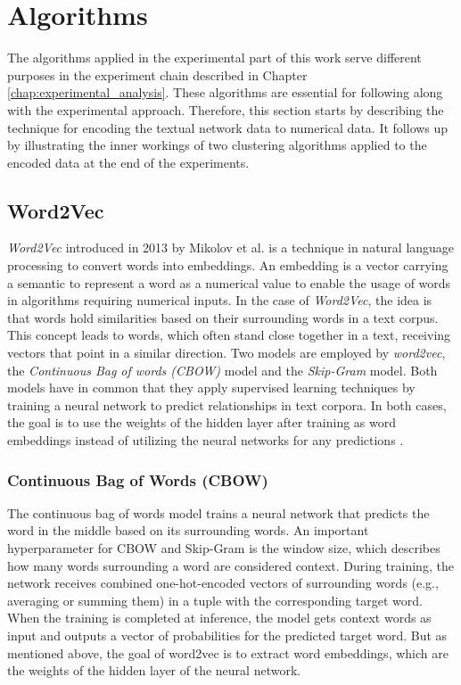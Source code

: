 \documentclass[
    fontsize=12pt,
    headings=small,
    parskip=half,           %
    bibliography=totoc,
    numbers=noenddot,       %
    open=any,               %
    ]{scrreprt}
\begin{document}
\section{Algorithms}
The algorithms applied in the experimental part of this work serve different purposes in the experiment chain described in Chapter \ref{chap:experimental_analysis}. These algorithms are essential for following along with the experimental approach. Therefore, this section starts by describing the technique for encoding the textual network data to numerical data. It follows up by illustrating the inner workings of two clustering algorithms applied to the encoded data at the end of the experiments.


\subsection{Word2Vec}
\emph{Word2Vec} introduced in 2013 by Mikolov et al. is a technique in natural language processing to convert words into embeddings. An embedding is a vector carrying a semantic to represent a word as a numerical value to enable the usage of words in algorithms requiring numerical inputs. In the case of \emph{Word2Vec}, the idea is that words hold similarities based on their surrounding words in a text corpus. This concept leads to words, which often stand close together in a text, receiving vectors that point in a similar direction. Two models are employed by \emph{word2vec}, the \emph{Continuous Bag of words (CBOW)} model and the \emph{Skip-Gram} model. Both models have in common that they apply supervised learning techniques by training a neural network to predict relationships in text corpora. In both cases, the goal is to use the weights of the hidden layer after training as word embeddings instead of utilizing the neural networks for any predictions \cite{mikolov2013efficient} \cite{rong2014word2vec}.

\subsubsection{Continuous Bag of Words (CBOW)}
The continuous bag of words model trains a neural network that predicts the word in the middle based on its surrounding words. An important hyperparameter for CBOW and Skip-Gram is the window size, which describes how many words surrounding a word are considered context. 
During training, the network receives combined one-hot-encoded vectors of surrounding words (e.g., averaging or summing them) in a tuple with the corresponding target word. When the training is completed at inference, the model gets context words as input and outputs a vector of probabilities for the predicted target word. But as mentioned above, the goal of word2vec is to extract word embeddings, which are the weights of the hidden layer of the neural network.
\end{document}
